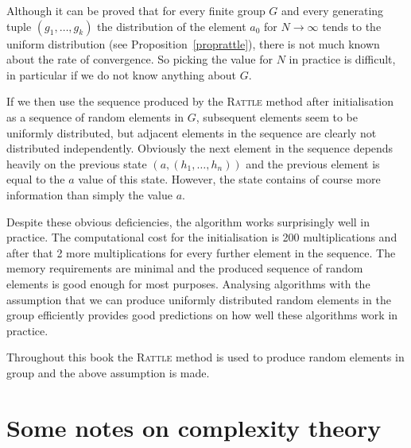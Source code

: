 Although it can be proved that for every finite group $G$ and every
generating tuple $(g_1, \ldots, g_k)$ the distribution of the element
$a_0$ for $N \to \infty$ tends to the uniform distribution (see
Proposition~\ref{proprattle}), there is
not much known about the rate of convergence. So picking the value for
$N$ in practice is difficult, in particular if we do not know anything
about $G$.

If we then use the sequence produced by the \textsc{Rattle} method
after initialisation as a sequence of random elements in $G$, 
subsequent elements seem to be uniformly distributed, but adjacent
elements in the sequence are clearly not distributed independently.
Obviously the next element in the sequence depends heavily on the
previous state $(a,(h_1,\ldots,h_n))$ and the previous element is
equal to the $a$ value of this state. However, the state contains of
course more information than simply the value $a$.

Despite these obvious deficiencies, the algorithm
works surprisingly well in practice. The computational cost for the 
initialisation is 200 multiplications and after that 2 more
multiplications for every further element in the sequence.
The memory requirements are minimal and the produced sequence of
random elements is good enough for most purposes. Analysing algorithms
with the assumption that we can produce uniformly distributed random
elements in the group efficiently provides good predictions on how
well these algorithms work in practice.

Throughout this book the \textsc{Rattle} method is used to produce
random elements in group and the above assumption is made.

\section{Some notes on complexity theory}
\label{sec:complexity}

